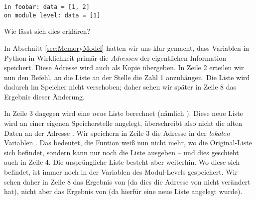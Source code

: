 \begin{cmdbox}
\begin{verbatim}
in foobar: data = [1, 2]
on module level: data = [1]
\end{verbatim}
\end{cmdbox}

Wie lässt sich dies erklären?

In Abschnitt \ref{sec:MemoryModel} hatten wir uns klar gemacht, dass Variablen in Python in Wirklichkeit primär die \emph{Adressen} der eigentlichen Information speichert. Diese Adresse wird auch als Kopie übergeben. In Zeile 2 erteilen wir nun den Befehl, an die Liste an der Stelle  die Zahl 1 anzuhängen. Die Liste wird dadurch im Speicher nicht verschoben; daher sehen wir später in Zeile 8 das Ergebnis dieser Änderung.

In Zeile 3 dagegen wird eine \emph{neue} Liste berechnet (nämlich \inPy{[1, 2]}). Diese neue Liste wird an einer eigenen Speicherstelle angelegt, überschreibt also nicht die alten Daten an der Adresse . Wir speichern in Zeile 3 die Adresse in der \emph{lokalen} Variablen . Das bedeutet, die Funtion  weiß nun nicht mehr, wo die Original-Liste sich befindet, sondern kann nur noch die Liste \inPy{[1 ,2]} ausgeben -- und dies geschieht auch in Zeile 4. Die ursprüngliche Liste besteht aber weiterhin. Wo diese sich befindet, ist immer noch in der Variablen  des Modul-Levels gespeichert. Wir sehen daher in Zeile 8 das Ergebnis von  (da dies die Adresse von  nicht verändert hat), nicht aber das Ergebnis von  (da hierfür eine neue Liste angelegt wurde).

